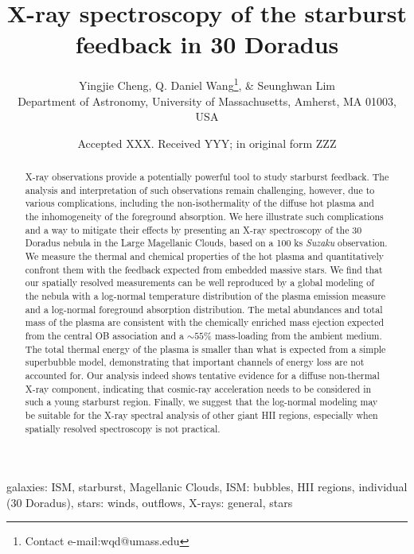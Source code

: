 \documentclass[usenatbib]{mnras}
\date{Accepted XXX. Received YYY; in original form ZZZ}
\begin{document}
\title[]{X-ray spectroscopy of the starburst feedback in 30 Doradus}

\author[]{Yingjie Cheng,  Q. Daniel Wang\thanks{Contact e-mail:wqd@umass.edu},  \& Seunghwan Lim\\
  Department of Astronomy, University of Massachusetts,   Amherst, MA 01003, USA\\}

\maketitle
\begin{abstract}
X-ray observations provide a potentially powerful tool to study starburst feedback. The analysis and interpretation of such observations remain challenging, however, due to various complications, including the non-isothermality of the diffuse hot plasma and the inhomogeneity of the foreground absorption. We here illustrate such complications and a way to mitigate their effects by presenting an X-ray spectroscopy of the 30 Doradus  nebula in the Large Magellanic Clouds, based on a 100 ks {\sl Suzaku} observation. We measure the thermal and chemical properties of the hot plasma and quantitatively confront them with the feedback expected from embedded massive stars. We find that our spatially resolved measurements can be well reproduced by a global modeling of the nebula with a log-normal temperature distribution of the plasma emission measure and a log-normal foreground absorption distribution. The metal abundances and total mass of the plasma are consistent with the chemically enriched mass ejection expected from the central OB association and a $\sim 55\%$ mass-loading from the ambient medium. The total thermal energy of the plasma is smaller than what is expected from a simple superbubble model, demonstrating that important channels of energy loss are not accounted for. Our analysis indeed shows tentative evidence for a diffuse non-thermal X-ray component, indicating that cosmic-ray acceleration needs to be considered in such a young starburst region. Finally, we suggest that the log-normal modeling may be suitable for the X-ray spectral analysis of other giant HII regions, especially when spatially resolved spectroscopy is not practical. 
\end{abstract}
\begin{keywords}
galaxies: ISM, starburst, Magellanic Clouds, ISM: bubbles, HII regions, individual (30 Doradus), stars: winds, outflows, X-rays: general, stars
\end{keywords}
\end{document}
